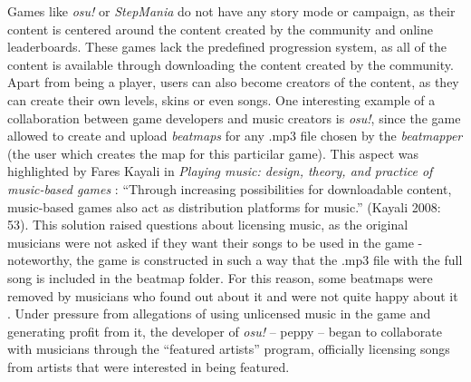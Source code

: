 Games like \textit{osu!} or \textit{StepMania} do not have any story mode or campaign, as their content is centered around the content created by the community and online leaderboards. These games lack the predefined progression system, as all of the content is available through downloading the content created by the community. Apart from being a player, users can also become creators of the content, as they can create their own levels, skins or even songs. One interesting example of a collaboration between game developers and music creators is \textit{osu!}, since the game allowed to create and upload \textit{beatmaps} for any .mp3 file chosen by the \textit{beatmapper} (the user which creates the map for this particilar game). This aspect was highlighted by Fares Kayali in \textit{Playing music: design, theory, and practice of music-based games} \cite{faresplayingmusic}: “Through increasing possibilities for downloadable content, music-based games also act as distribution platforms for music.” (Kayali 2008: 53). This solution raised questions about licensing music, as the original musicians were not asked if they want their songs to be used in the game - noteworthy, the game is constructed in such a way that the .mp3 file with the full song is included in the beatmap folder. For this reason, some beatmaps were removed by musicians who found out about it and were not quite happy about it \cite{osucontroversy}. Under pressure from allegations of using unlicensed music in the game and generating profit from it, the developer of \textit{osu!} -- peppy -- began to collaborate with musicians through the “featured artists” program, officially licensing songs from artists that were interested in being featured. 

